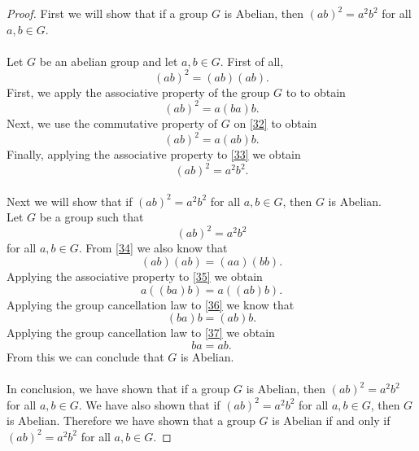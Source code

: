 \documentclass[11pt,a4paper]{article}
\begin{document}
\begin{proof}
First we will show that if a group $G$ is Abelian, then $(ab)^2 = a^2 b^2$ for all $a, b \in G$.\\
~\\
Let $G$ be an abelian group and let $a,b\in G$. First of all,
\begin{equation}\label{31}
(ab)^2 = (ab)(ab).
\end{equation}
First, we apply the associative property of the group $G$ to \label{31} to obtain
\begin{equation}\label{32}
(ab)^2 = a(ba)b.
\end{equation}
Next, we use the commutative property of $G$ on \eqref{32} to obtain
\begin{equation}\label{33}
(ab)^2 = a(ab)b.
\end{equation}
Finally, applying the associative property to \eqref{33} we obtain
\[(ab)^2 = a^2b^2.\]
~\\
Next we will show that if $(ab)^2 = a^2b^2$ for all $a,b\in G$, then $G$ is Abelian.
~\\
Let $G$ be a group such that
\begin{equation}\label{34}
(ab)^2 = a^2b^2
\end{equation}
for all $a,b \in G$. From \eqref{34} we also know that
\begin{equation}\label{35}
(ab)(ab) = (aa)(bb).
\end{equation}
Applying the associative property to \eqref{35} we obtain
\begin{equation}\label{36}
a((ba)b) = a((ab)b).
\end{equation}
Applying the group cancellation law to \eqref{36} we know that
\begin{equation}\label{37}
(ba)b = (ab)b.
\end{equation}
Applying the group cancellation law to \eqref{37} we obtain
\[ba = ab.\]
From this we can conclude that $G$ is Abelian.\\
~\\
In conclusion, we have shown that if a group $G$ is Abelian, then $(ab)^2 = a^2 b^2$ for all $a, b \in G$. We have also shown that if $(ab)^2 = a^2b^2$ for all $a,b\in G$, then $G$ is Abelian. Therefore we have shown that a group $G$ is Abelian if and only if $(ab)^2 = a^2 b^2$ for all $a, b \in G$.
\end{proof}
\end{document}
